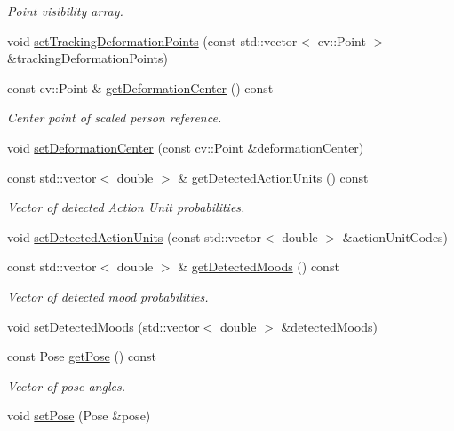 \begin{DoxyCompactItemize}
\begin{DoxyCompactList}\small\item\em Point visibility array. \end{DoxyCompactList}\item 
void \hyperlink{classinsight_1_1Person_a60bd56f1f861761a7a86a626c9e4a364}{set\+Tracking\+Deformation\+Points} (const std\+::vector$<$ cv\+::\+Point $>$ \&tracking\+Deformation\+Points)
\item 
const cv\+::\+Point \& \hyperlink{classinsight_1_1Person_a3b246b9f6955527213ccd3b3a065f96e}{get\+Deformation\+Center} () const 
\begin{DoxyCompactList}\small\item\em Center point of scaled person reference. \end{DoxyCompactList}\item 
void \hyperlink{classinsight_1_1Person_aaa0bad1f6bc9a00e1e9012e81cb47d64}{set\+Deformation\+Center} (const cv\+::\+Point \&deformation\+Center)
\item 
const std\+::vector$<$ double $>$ \& \hyperlink{classinsight_1_1Person_af738a5fe0420c6c3a940c6771d0ca979}{get\+Detected\+Action\+Units} () const 
\begin{DoxyCompactList}\small\item\em Vector of detected Action Unit probabilities. \end{DoxyCompactList}\item 
void \hyperlink{classinsight_1_1Person_aaf7cd6f10728b0d128ab06a62fa11a73}{set\+Detected\+Action\+Units} (const std\+::vector$<$ double $>$ \&action\+Unit\+Codes)
\item 
const std\+::vector$<$ double $>$ \& \hyperlink{classinsight_1_1Person_a4d2e633cc52fe2ec5f8773b225a540aa}{get\+Detected\+Moods} () const 
\begin{DoxyCompactList}\small\item\em Vector of detected mood probabilities. \end{DoxyCompactList}\item 
void \hyperlink{classinsight_1_1Person_ae68353bc3925e6441b9af659b35e082a}{set\+Detected\+Moods} (std\+::vector$<$ double $>$ \&detected\+Moods)
\item 
const Pose \hyperlink{classinsight_1_1Person_ab66592f86fcbe53273275756d6d3d388}{get\+Pose} () const 
\begin{DoxyCompactList}\small\item\em Vector of pose angles. \end{DoxyCompactList}\item 
void \hyperlink{classinsight_1_1Person_aea53fda2ba4039dbf8d1c1f4c44e6440}{set\+Pose} (Pose \&pose)
\end{DoxyCompactItemize}



